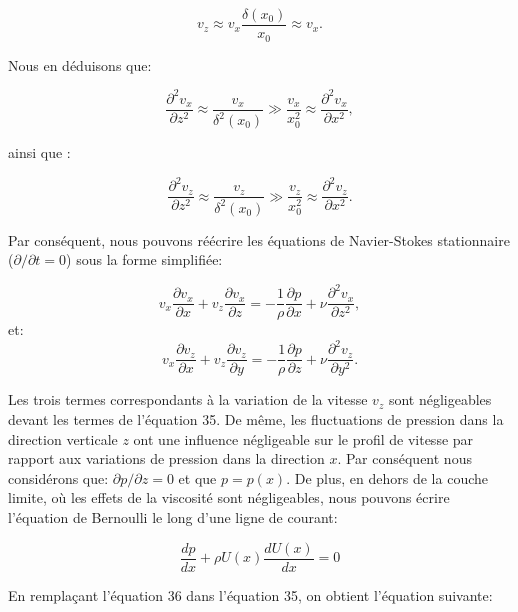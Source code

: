 \documentclass[french, 10pt]{article}
\begin{document}
\begin{equation}
  v_z\approx v_x\frac{\delta(x_0)}{x_0}\approx v_x. 
\end{equation}

Nous en déduisons que:

\begin{equation}
\frac{\partial^2v_x}{\partial z^2}\approx \frac{v_x}{\delta^2(x_0)} \gg \frac{v_x}{x_0^2} \approx \frac{\partial^2v_x}{\partial x^2},\label{eq:simplx}
\end{equation}

ainsi que :

\begin{equation}
  \frac{\partial^2v_z}{\partial z^2}\approx \frac{v_z}{\delta^2(x_0)} \gg \frac{v_z}{x_0^2} \approx \frac{\partial^2v_z}{\partial x^2}.\label{eq:simplz}
  \end{equation}
  
Par conséquent, nous pouvons réécrire les équations de Navier-Stokes stationnaire ($\partial/\partial t = 0$) sous la forme simplifiée: 

\begin{equation}
  v_x\frac{\partial v_x}{\partial x}+v_z\frac{\partial v_x}{\partial z} = -\frac{1}{\rho}\frac{\partial p}{\partial x} + \nu\frac{\partial^2v_x}{\partial z^2},
\end{equation}
et:
\begin{equation}
 v_x\frac{\partial v_z}{\partial x}+v_z\frac{\partial v_z}{\partial y} = -\frac{1}{\rho}\frac{\partial p}{\partial z} + \nu\frac{\partial^2v_z}{\partial y^2}.
\end{equation}

Les trois termes correspondants à la variation de la vitesse $v_z$ sont négligeables devant les termes de l'équation 35. De même, les fluctuations de pression dans la direction verticale $z$ ont une influence négligeable sur le profil de vitesse par rapport aux variations de pression dans la direction $x$. Par conséquent nous considérons que: $\partial p/\partial z = 0$ et que $p=p(x)$. De plus, en dehors de la couche limite, où les effets de la viscosité sont négligeables, nous pouvons écrire l'équation de Bernoulli le long d'une ligne de courant:

\begin{equation}
  \frac{d p}{dx} +\rho U(x)\frac{dU(x)}{dx}=0
\end{equation}

En remplaçant l'équation 36 dans l'équation 35, on obtient l'équation suivante:
\end{document}
